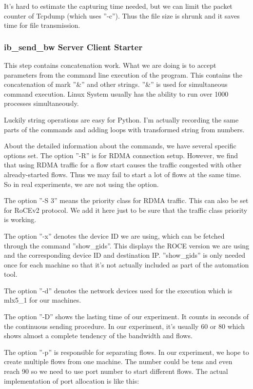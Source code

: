 \documentclass[12pt,a4paper]{article}
\begin{document}
It's hard to estimate the capturing time needed, but we can limit the packet counter of Tcpdump (which uses ''-c'').
Thus the file size is shrunk and it saves time for file transmission.

\subsubsection{ib\_send\_bw Server Client Starter}

This step contains concatenation work.
What we are doing is to accept parameters from the command line execution of the program.
This contains the concatenation of mark ''\&'' and other strings.
''\&'' is used for simultaneous command execution. Linux System usually has the ability to run over 1000 processes simultaneously.

Luckily string operations are easy for Python.
I'm actually recording the same parts of the commands and adding loops with transformed string from numbers.

About the detailed information about the commands, we have several specific options set.
The option ''-R'' is for RDMA connection setup. However, we find that using RDMA traffic for a flow start causes
the traffic congested with other already-started flows. Thus we may fail to start a lot of flows at the same time.
So in real experiments, we are not using the option.

The option ''-S 3'' means the priority class for RDMA traffic. This can also be set for RoCEv2 protocol.
We add it here just to be sure that the traffic class priority is working.

The option ''-x'' denotes the device ID we are using, which can be fetched through the command ''show\_gids''.
This displays the ROCE version we are using and the corresponding device ID and destination IP.
''show\_gids'' is only needed once for each machine so that it's not actually included as part of the automation tool.

The option ''-d'' denotes the network devices used for the execution which is mlx5\_1 for our machines.

The option ''-D'' shows the lasting time of our experiment. It counts in seconds of the continuous sending procedure.
In our experiment, it's usually 60 or 80 which shows almost a complete tendency of the bandwidth and flows.

The option ''-p'' is responsible for separating flows. In our experiment, we hope to create multiple flows from one machine.
The number could be tens and even reach 90 so we need to use port number to start different flows.
The actual implementation of port allocation is like this: 
\end{document}
